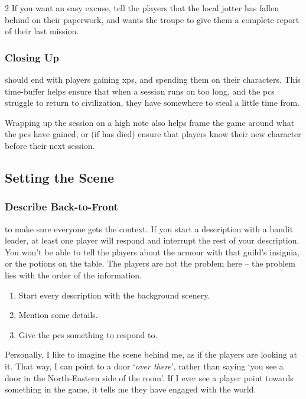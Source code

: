 \begin{multicols}{2}
If you want an easy excuse, tell the players that the local \gls{jotter} has fallen behind on their paperwork, and wants the troupe to give them a complete report of their last mission.

\subsubsection{Closing Up}
should end with players gaining \glspl{xp}, and spending them on their characters.
This time-buffer helps ensure that when a session runs on too long, and the \glspl{pc} struggle to return to civilization, they have somewhere to steal a little time from.

Wrapping up the session on a high note also helps frame the game around what the \glspl{pc} have gained, or (if  has died) ensure that players know their new character before their next session.

\subsection{Setting the Scene}

\subsubsection{Describe Back-to-Front}
to make sure everyone gets the context.
If you start a description with a bandit leader, at least one player will respond and interrupt the rest of your description.
You won't be able to tell the players about the armour with that guild's insignia, or the potions on the table.
The players are not the problem here -- the problem lies with the order of the information.

\begin{enumerate}
  \item
  Start every description with the background scenery.
  \item
  Mention some details.
  \item
  Give the \glspl{pc} something to respond to.
\end{enumerate}

\columnbreak

Personally, I like to imagine the scene behind me, as if the players are looking at it.
That way, I can point to a door `\emph{over there}', rather than saying `you see a door in the North-Eastern side of the room'.
If I ever see a player point towards something in the game, it tells me they have engaged with the world.


\end{multicols}
